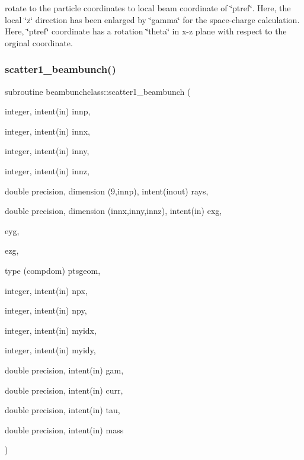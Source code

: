 rotate to the particle coordinates to local beam coordinate of \char`\"{}ptref\char`\"{}. Here, the local \char`\"{}z\char`\"{} direction has been enlarged by \char`\"{}gamma\char`\"{} for the space-\/charge calculation. Here, \char`\"{}ptref\char`\"{} coordinate has a rotation \char`\"{}theta\char`\"{} in x-\/z plane with respect to the orginal coordinate. 

\mbox{\label{namespacebeambunchclass_a023a12f9279f0764fc57deda1bcb852f}} 
\subsubsection{\texorpdfstring{scatter1\_beambunch()}{scatter1\_beambunch()}}
{\footnotesize\ttfamily subroutine beambunchclass\+::scatter1\+\_\+beambunch (\begin{DoxyParamCaption}\item[{integer, intent(in)}]{innp,  }\item[{integer, intent(in)}]{innx,  }\item[{integer, intent(in)}]{inny,  }\item[{integer, intent(in)}]{innz,  }\item[{double precision, dimension (9,innp), intent(inout)}]{rays,  }\item[{double precision, dimension (innx,inny,innz), intent(in)}]{exg,  }\item[{}]{eyg,  }\item[{}]{ezg,  }\item[{type (compdom)}]{ptsgeom,  }\item[{integer, intent(in)}]{npx,  }\item[{integer, intent(in)}]{npy,  }\item[{integer, intent(in)}]{myidx,  }\item[{integer, intent(in)}]{myidy,  }\item[{double precision, intent(in)}]{gam,  }\item[{double precision, intent(in)}]{curr,  }\item[{double precision, intent(in)}]{tau,  }\item[{double precision, intent(in)}]{mass }\end{DoxyParamCaption})}



